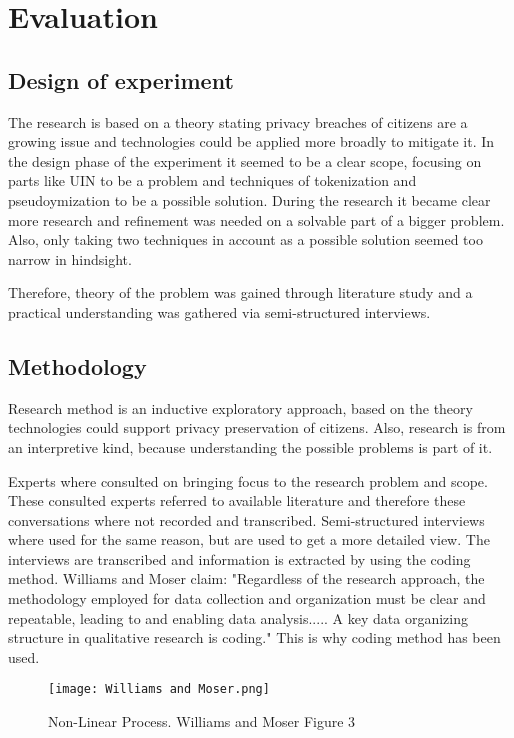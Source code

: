 \chapter{Evaluation}\label{s:evaluation}

\section{Design of experiment}
The research is based on a theory stating privacy breaches of citizens are a growing issue and technologies could be applied more broadly to mitigate it. In the design phase of the experiment it seemed to be a clear scope, focusing on parts like UIN to be a problem and techniques of tokenization and pseudoymization to be a possible solution. During the research it became clear more research and refinement was needed on a solvable part of a bigger problem. Also, only taking two techniques in account as a possible solution seemed too narrow in hindsight.

Therefore, theory of the problem was gained through literature study and a practical understanding was gathered via semi-structured interviews.

\section{Methodology}
Research method is an inductive exploratory approach, based on the theory technologies could support privacy preservation of citizens. Also, research is from an interpretive kind, because understanding the possible problems is part of it.

Experts where consulted on bringing focus to the research problem and scope. These consulted experts referred to available literature and therefore these conversations where not recorded and transcribed. 
Semi-structured interviews where used for the same reason, but are used to get a more detailed view. The interviews are transcribed and information is extracted by using the coding method.  Williams and Moser \cite{Williams2019TheAO} claim: "Regardless of the research approach, the methodology employed for data collection and
organization must be clear and repeatable, leading to and enabling data analysis..... A key data organizing structure in qualitative research is coding." This is why coding method has been used. 

\graphicspath{ {./images/} }
\begin{figure}
\centering
\label{fig:WM2019}
\texttt{[image: Williams and Moser.png]}\\
\caption{Non-Linear Process. Williams and Moser \cite{Williams2019TheAO} Figure 3}
\end{figure}

